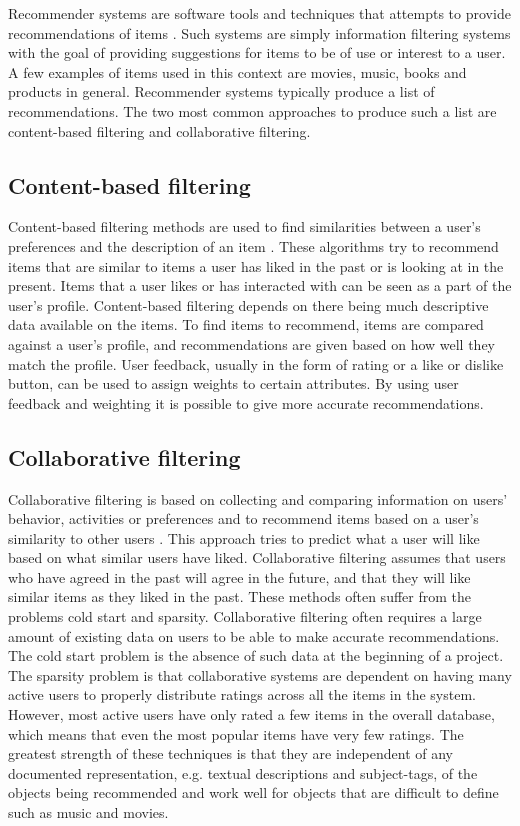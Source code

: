 Recommender systems are software tools and techniques that attempts to provide recommendations of items \cite{HM4}. Such systems are simply information filtering systems with the goal of providing suggestions for items to be of use or interest to a user. A few examples of items used in this context are movies, music, books and products in general. Recommender systems typically produce a list of recommendations.  The two most common approaches to produce such a list are content-based filtering and collaborative filtering.

\subsection{Content-based filtering}

Content-based filtering methods are used to find similarities between a user’s preferences and the description of an item \cite{HM5}. These algorithms try to recommend items that are similar to items a user has liked in the past or is looking at in the present. Items that a user likes or has interacted with can be seen as a part of the user’s profile. Content-based filtering depends on there being much descriptive data available on the items. To find items to recommend, items are compared against a user’s profile, and recommendations are given based on how well they match the profile. User feedback, usually in the form of rating or a like or dislike button, can be used to assign weights to certain attributes. By using user feedback and weighting it is possible to give more accurate recommendations. \cite{HM4}

\subsection{Collaborative filtering}

Collaborative filtering is based on collecting and comparing information on users’ behavior, activities or preferences and to recommend items based on a user’s similarity to other users \cite{HM6}. This approach tries to predict what a user will like based on what similar users have liked. Collaborative filtering assumes that users who have agreed in the past will agree in the future, and that they will like similar items as they liked in the past. These methods often suffer from the problems cold start and sparsity. Collaborative filtering often requires a large amount of existing data on users to be able to make accurate recommendations. The cold start problem is the absence of such data at the beginning of a project. The sparsity problem is that collaborative systems are dependent on having many active users to properly distribute ratings across all the items in the system. However, most active users have only rated a few items in the overall database, which means that even the most popular items have very few ratings. The greatest strength of these techniques is that they are independent of any documented representation, e.g. textual descriptions and subject-tags, of the objects being recommended and work well for objects that are difficult to define such as music and movies.\cite{HM4}


